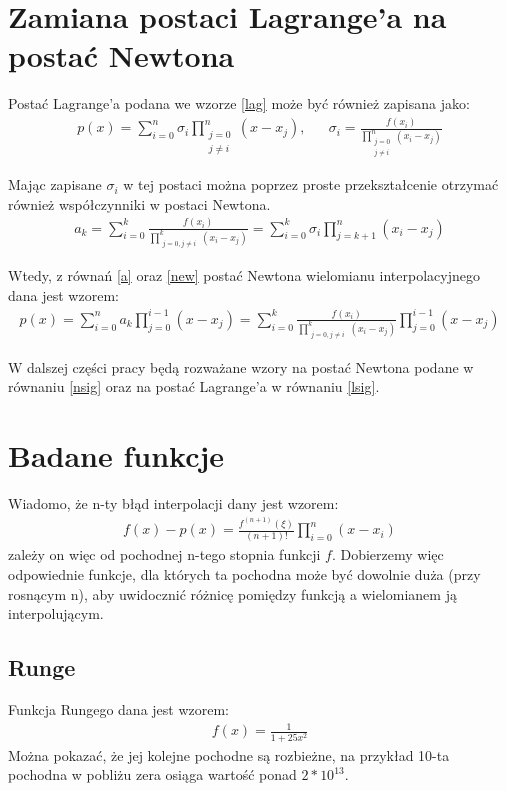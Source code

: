 \documentclass[paper=a4, fontsize=11pt]{scrartcl} %
\numberwithin{equation}{section} %
\numberwithin{figure}{section} %
\numberwithin{table}{section} %
\begin{document}
\section{Zamiana postaci Lagrange'a na postać Newtona}
Postać Lagrange'a podana we wzorze \ref{lag} może być również zapisana jako:
\begin{align} 
 p(x)= \sum_{i=0}^{n} \sigma_i \prod_{\substack{j=0 \\ j \neq i}}^n (x-x_j), &&	\label{lsig}
 \sigma_i = \frac{f(x_i)}{\prod_{\substack{j=0 \\ j \neq i}}^n (x_i-x_j)}
\end{align}

Mając zapisane $\sigma_i$ w tej postaci można poprzez proste przekształcenie otrzymać
również współczynniki w postaci Newtona.
\begin{align} 
 a_k = \sum_{i=0}^k \frac{f(x_i)} {\prod_{\substack{j=0, j \neq i}}^k (x_i - x_j)} \label{a}
 = \sum_{i=0}^k \sigma_i \prod_{j=k+1}^n (x_i-x_j)
\end{align}

Wtedy, z równań \ref{a} oraz \ref{new} postać Newtona wielomianu interpolacyjnego
dana jest wzorem:
\begin{align} 
 p(x)= \sum_{i=0}^{n} a_k \prod_{j=0}^{i-1} (x-x_j) \label{nsig}
 = \sum_{i=0}^k \frac{f(x_i)} {\prod_{\substack{j=0, j \neq i}}^k (x_i - x_j)} \prod_{j=0}^{i-1} (x-x_j)
\end{align}

W dalszej części pracy będą rozważane wzory na postać Newtona podane w równaniu
\ref{nsig} oraz na postać Lagrange'a w równaniu \ref{lsig}.

\section{Badane funkcje}

Wiadomo, że n-ty błąd interpolacji dany jest wzorem:
\begin{align} 
 f(x) - p(x) = \frac{f^{(n+1)}(\xi)}{(n+1)!} \prod_{i=0}^n (x-x_i)
\end{align}
zależy on więc od pochodnej n-tego stopnia funkcji $f$. 
Dobierzemy więc odpowiednie funkcje, dla których ta pochodna może być dowolnie duża
(przy rosnącym n), aby uwidocznić różnicę pomiędzy funkcją a wielomianem ją interpolującym.

\subsection{Runge}
Funkcja Rungego dana jest wzorem:
\begin{align}
 f(x) = \frac{1}{1+25x^2} 
\end{align}
Można pokazać, że jej kolejne pochodne są rozbieżne, na przykład 10-ta pochodna
w pobliżu zera osiąga wartość ponad $2*10^13$.
\end{document}
